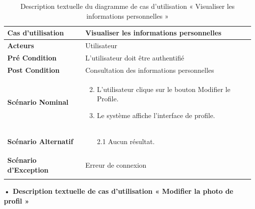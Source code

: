 \begin{longtable}{|p{5cm}|p{10cm}|}
\hline
\textbf{Cas d'utilisation}&Visualiser les informations personnelles   \\
\hline
\textbf{Acteurs}&Utilisateur\\
\hline
\textbf{Pré Condition}&L'utilisateur doit être authentifié\\
\hline
\textbf{Post Condition}&Consultation des informations personnelles \\
\hline
\textbf{Scénario Nominal}&
\vspace{-\baselineskip}
\begin{enumerate}
  \setcounter{enumi}{1}
  \item L'utilisateur clique sur le bouton Modifier le Profile.
  \item Le système affiche l'interface de profile.
\end{enumerate}\\
\hline
\textbf{Scénario Alternatif}&
\vspace{-\baselineskip}
\begin{enumerate}
 \item [2.1] Aucun résultat.
\end{enumerate}\\
\hline
\textbf{Scénario d'Exception}&
Erreur de connexion\\
\hline
\caption{Description textuelle du diagramme de cas d'utilisation « Visualiser les informations personnelles   »}
\label{tab:use_case_view_personal_information}
\end{longtable}

\textbf{•	Description textuelle de cas d'utilisation « Modifier la photo de profil  »}

